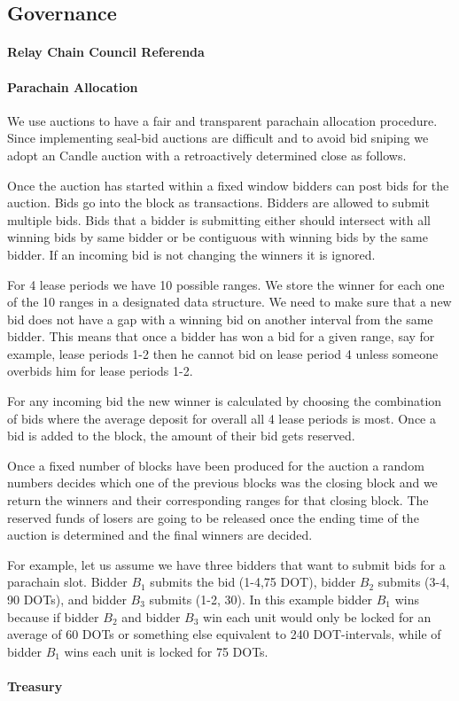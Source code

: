 \subsection{Governance}
 \paragraph{Relay Chain Council Referenda}
 \paragraph{Parachain Allocation}
We use auctions to have a fair and transparent parachain allocation procedure.
Since implementing seal-bid auctions are difficult and to avoid bid sniping we adopt an Candle auction \cite{} with a retroactively determined close as follows.

Once the auction has started within a fixed window bidders can post bids for the auction.
Bids go into the block as transactions.
Bidders are allowed to submit multiple bids.
Bids that a bidder is submitting either should intersect with all winning bids by same bidder or be contiguous with winning bids by the same bidder.
If an incoming bid is not changing the winners it is ignored.

For 4 lease periods we have 10 possible ranges.
We store the winner for each one of the 10 ranges in a designated data structure.
We need to make sure that a new bid does not have a gap with a winning bid on another interval from the same bidder.
This means that once a bidder has won a bid for a given range, say for example, lease periods 1-2 then he cannot bid on lease period 4 unless someone overbids him for lease periods 1-2.

For any incoming bid the new winner is calculated by choosing the combination of bids where the average deposit for overall all 4 lease periods is most.
Once a bid is added to the block, the amount of their bid gets reserved.

Once a fixed number of blocks have been produced for the auction a random numbers decides which one of the previous blocks was the closing block and we return the winners and their corresponding ranges for that closing block.
The reserved funds of losers are going to be released once the ending time of the auction is determined and the final winners are decided.

For example, let us assume we have three bidders that want to submit bids for a parachain slot.
Bidder $B_1$ submits the bid (1-4,75 DOT), bidder $B_2$ submits (3-4, 90 DOTs), and bidder $B_3$ submits (1-2, 30).
In this example bidder $B_1$ wins because if bidder $B_2$ and bidder $B_3$ win each unit would only be locked for an average of 60 DOTs or something else equivalent to 240 DOT-intervals, while of bidder $B_1$ wins each unit is locked for 75 DOTs.

 \paragraph{Treasury}
